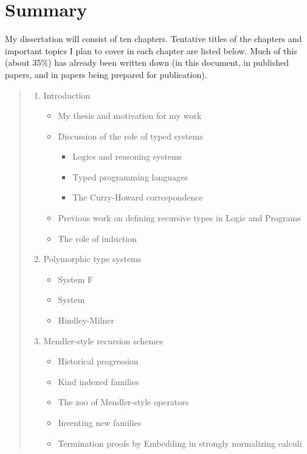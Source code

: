 \section{Summary}\label{sec:summary}
My dissertation will consist of ten chapters.
Tentative titles of the chapters and important topics I plan to cover in each
chapter are listed below. Much of this (about 35\%) has already been written down
(in this document, in published papers, and in papers being prepared
for publication). 
\begin{quote}
\begin{enumerate}[1.]
\item Introduction
\begin{itemize}
\item My thesis and motivation for my work
\item Discussion of the role of typed systems
   \begin{itemize}
     \item Logics and reasoning systems
     \item Typed programming languages
     \item The Curry-Howard correspondence
   \end{itemize}
\item Previous work on defining recursive types in Logic and Programs
\item The role of induction
\end{itemize}

\item Polymorphic type systems 
 \begin{itemize}
     \item System \textsf{F}
     \item System \Fw
     \item Hindley-Milner
 \end{itemize}
 
\item Mendler-style recursion schemes
  \begin{itemize}
     \item Historical progression
     \item Kind indexed families
     \item The zoo of Mendler-style operators
     \item Inventing new families
     \item Termination proofs by Embedding in strongly normalizing calculi
  \end{itemize}


\end{enumerate}
\end{quote}
